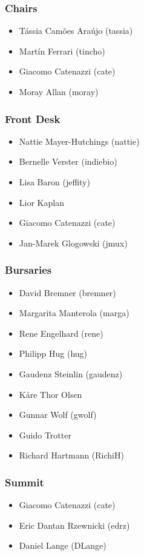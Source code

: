 \documentclass[t]{beamer}
\begin{document}
\begin{frame}
	\frametitle{Chairs}
	\begin{itemize}
		\item Tássia Camões Araújo (tassia)
		\item Martín Ferrari (tincho)
		\item Giacomo Catenazzi (cate)
		\item Moray Allan (moray)
	\end{itemize}
\end{frame}

\begin{frame}
	\frametitle{Front Desk}
	\begin{itemize}
		\item Nattie Mayer-Hutchings (nattie)
		\item Bernelle Verster (indiebio)
		\item Lisa Baron (jeffity)
		\item Lior Kaplan
		\item Giacomo Catenazzi (cate)
		\item Jan-Marek Glogowski (jmux)
	\end{itemize}
\end{frame}

\begin{frame}
	\frametitle{Bursaries}
	\begin{itemize}
		\item David Bremner (bremner)
		\item Margarita Manterola (marga)
		\item Rene Engelhard (rene)
		\item Philipp Hug (hug)
		\item Gaudenz Steinlin (gaudenz)
		\item Kåre Thor Olsen
		\item Gunnar Wolf (gwolf)
		\item Guido Trotter
		\item Richard Hartmann (RichiH)
	\end{itemize}
\end{frame}

\begin{frame}
	\frametitle{Summit}
	\begin{itemize}
		\item Giacomo Catenazzi (cate)
		\item Eric Dantan Rzewnicki (edrz)
		\item Daniel Lange (DLange)
	\end{itemize}
\end{frame}
\end{document}
